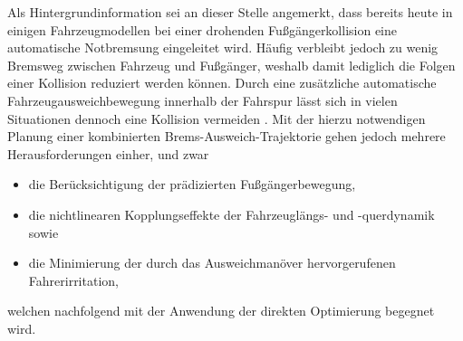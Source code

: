 Als Hintergrundinformation sei an dieser Stelle angemerkt, dass bereits heute in einigen Fahrzeugmodellen bei einer drohenden Fußgängerkollision eine automatische Notbremsung eingeleitet wird. Häufig verbleibt jedoch zu wenig Bremsweg zwischen Fahrzeug und Fußgänger, weshalb damit lediglich die Folgen einer Kollision reduziert werden können. %
Durch eine zusätzliche automatische Fahrzeugausweichbewegung innerhalb der Fahrspur lässt sich in vielen Situationen dennoch eine Kollision vermeiden \cite{hattori2006optimum}. Mit der hierzu notwendigen Planung einer kombinierten Brems-Ausweich-Trajektorie gehen jedoch mehrere Herausforderungen einher, und zwar
\begin{itemize}
	\item die Berücksichtigung der prädizierten Fußgängerbewegung, 
	\item die nichtlinearen Kopplungseffekte der Fahrzeuglängs- und -querdynamik sowie
	\item die Minimierung der durch das Ausweichmanöver hervorgerufenen Fahrerirritation,
\end{itemize}
welchen nachfolgend mit der Anwendung der direkten Optimierung begegnet wird.



